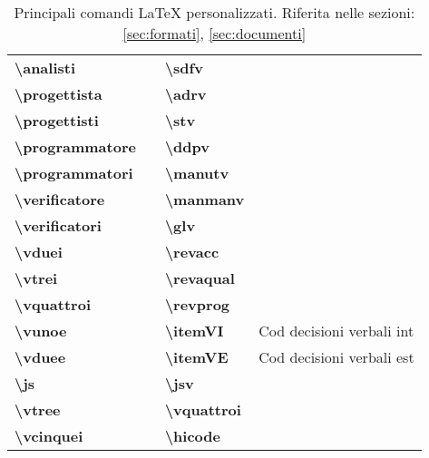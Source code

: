 \begin{table}[H]
{\begin{tabular}{llll}
		\textbf{\textbackslash analisti} & \analisti & \textbf{\textbackslash sdfv}     & \sdfv \\
		\textbf{\textbackslash progettista} & \progettista & \textbf{\textbackslash adrv}     & \adrv \\
		\textbf{\textbackslash progettisti} & \progettisti & \textbf{\textbackslash stv}      & \stv \\
		\textbf{\textbackslash programmatore} & \programmatore & \textbf{\textbackslash ddpv}     & \ddpv \\
		\textbf{\textbackslash programmatori} & \programmatori & \textbf{\textbackslash manutv} & \manutv \\
		\textbf{\textbackslash verificatore} & \verificatore & \textbf{\textbackslash manmanv} & \manmanv \\
		\textbf{\textbackslash verificatori} & \verificatori & \textbf{\textbackslash glv} & \glv \\
		\textbf{\textbackslash vduei} &   \vduei & \textbf{\textbackslash revacc}   & \revacc \\
		\textbf{\textbackslash vtrei} & \vtrei & \textbf{\textbackslash revaqual} & \revaqual \\
		\textbf{\textbackslash vquattroi} & \vquattroi & \textbf{\textbackslash revprog}  & \revprog \\
		\textbf{\textbackslash vunoe}  & \vunoe & \textbf{\textbackslash itemVI}   & Cod decisioni verbali int \\
		\textbf{\textbackslash vduee} & \vduee & \textbf{\textbackslash itemVE}   & Cod decisioni verbali est \\
		\textbf{\textbackslash js} & \js & \textbf{\textbackslash jsv} & \jsv \\
		\textbf{\textbackslash vtree}  & \vtree & \textbf{\textbackslash vquattroi} & \vquattroi \\
		\textbf{\textbackslash vcinquei}  & \vcinquei & \textbf{\textbackslash hicode} & \hicode{NomeComando} \\
		\bottomrule
	\end{tabular}}
	\caption{Principali comandi \LaTeX{} personalizzati. Riferita nelle sezioni: \ref{sec:formati}, \ref{sec:documenti}} 
\end{table}